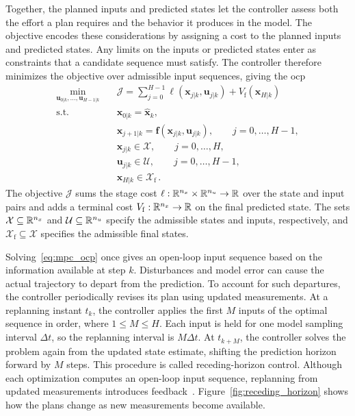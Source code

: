 \begin{samepage}
Together, the planned inputs and predicted states let the controller assess both the effort a plan requires and the behavior it produces in the model.
The objective encodes these considerations by assigning a cost to the planned inputs and predicted states.
Any limits on the inputs or predicted states enter as constraints that a candidate sequence must satisfy.
The controller therefore minimizes the objective over admissible input sequences, giving the \ac{ocp}~\cite{Rawlings2017}
%
\begin{equation}
    \begin{aligned}
        \min_{\mathbf{u}_{0|k},\ldots,\mathbf{u}_{H-1|k}}
        \quad & \mathcal{J}
        = \sum_{j=0}^{H-1}
          \ell(\mathbf{x}_{j|k},\mathbf{u}_{j|k})
          + V_\mathrm{f}(\mathbf{x}_{H|k}) \\
        \text{s.t.}\quad
        & \mathbf{x}_{0|k}=\hat{\mathbf{x}}_k, \\
        & \mathbf{x}_{j+1|k}=\mathbf{f}(\mathbf{x}_{j|k},\mathbf{u}_{j|k}),
          \qquad j=0,\ldots,H-1, \\
        & \mathbf{x}_{j|k}\in\mathcal{X},
          \qquad j=0,\ldots,H, \\
        & \mathbf{u}_{j|k}\in\mathcal{U},
          \qquad j=0,\ldots,H-1, \\
        & \mathbf{x}_{H|k}\in\mathcal{X}_\mathrm{f}\,.
    \end{aligned}
    \label{eq:mpc_ocp}
\end{equation}
The objective $\mathcal{J}$ sums the stage cost $\ell:\mathbb{R}^{n_{x}}\times\mathbb{R}^{n_{u}}\to\mathbb{R}$ over the state and input pairs and adds a terminal cost $V_\mathrm{f}:\mathbb{R}^{n_{x}}\to\mathbb{R}$ on the final predicted state.
The sets $\mathcal{X}\subseteq\mathbb{R}^{n_{x}}$ and $\mathcal{U}\subseteq\mathbb{R}^{n_{u}}$ specify the admissible states and inputs, respectively, and $\mathcal{X}_\mathrm{f}\subseteq\mathcal{X}$ specifies the admissible final states.
\end{samepage}
%
Solving~\eqref{eq:mpc_ocp} once gives an open-loop input sequence based on the information available at step $k$.
Disturbances and model error can cause the actual trajectory to depart from the prediction.
To account for such departures, the controller periodically revises its plan using updated measurements.
At a replanning instant $t_k$, the controller applies the first $M$ inputs of the optimal sequence in order, where $1\leq M\leq H$.
Each input is held for one model sampling interval $\Delta t$, so the replanning interval is $M\Delta t$.
At $t_{k+M}$, the controller solves the problem again from the updated state estimate, shifting the prediction horizon forward by $M$ steps.
This procedure is called receding-horizon control.
Although each optimization computes an open-loop input sequence, replanning from updated measurements introduces feedback~\cite{Findeisen2002}.
Figure~\ref{fig:receding_horizon} shows how the plans change as new measurements become available.

